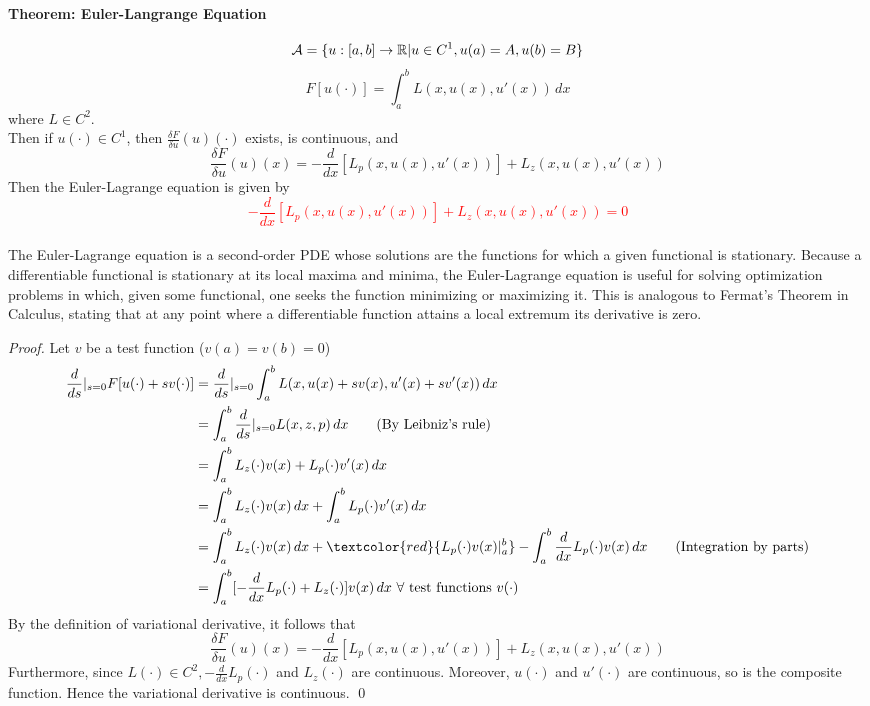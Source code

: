 \documentclass[11pt]{article}
\begin{document}
\paragraph{Theorem: Euler-Langrange Equation}
$$\mathcal{A} = \{ u: [a,b] \rightarrow \mathbb{R} | u \in C^1, u(a) = A, u(b) = B\}$$
$$F[u(\cdot)] = \int_a^b L(x,u(x),u'(x))\, dx$$
where $L \in C^2$. \\
Then if $u(\cdot) \in C^1$, then
$\frac{\delta F}{\delta u}(u)(\cdot)$ exists, is continuous, and
$$\frac{\delta F}{\delta u}(u)(x) = -\frac{d}{dx}[L_p(x,u(x),u'(x))] + L_z(x,u(x),u'(x))$$
Then the Euler-Lagrange equation is given by
\textcolor{red}{$$-\frac{d}{dx}[L_p(x,u(x),u'(x))] + L_z(x,u(x),u'(x)) = 0$$}\\
 The Euler-Lagrange equation is a second-order PDE whose solutions are the functions for which a given functional is stationary. Because a differentiable functional is stationary at its local maxima and minima, the Euler-Lagrange equation is useful for solving optimization problems in which, given some functional, one seeks the function minimizing or maximizing it. This is analogous to Fermat's Theorem in Calculus, stating that at any point where a differentiable function attains a local extremum its derivative is zero. \\
\begin{proof}
	Let $v$ be a test function ($v(a) = v(b) = 0$)
	\begin{align}
		\frac{d}{ds} |_{s=0} F[u(\cdot) + sv(\cdot)] 
		&= \frac{d}{ds}|_{s=0}\int_a^b L(x, u(x) + sv(x), u'(x) + sv'(x)) \, dx \\
		&= \int_a^b \frac{d}{ds}|_{s=0} L(x,z,p)\, dx \tag{By Leibniz's rule}\\
		&= \int_a^b L_z(\cdot)v(x) + L_p(\cdot)v'(x)\, dx \\
		&= \int_a^b L_z(\cdot)v(x) \, dx + \int_a^b L_p(\cdot)v'(x)\, dx \\
		&= \int_a^b L_z(\cdot)v(x) \, dx + \textcolor{red}{L_p(\cdot)v(x)|_a^b} - \int_a^b \frac{d}{dx}L_p(\cdot)v(x) \, dx \tag{Integration by parts} \\
		&= \int_a^b [-\frac{d}{dx}L_p(\cdot) + L_z(\cdot)]v(x) \, dx \text{  $\forall$ test functions $v(\cdot)$} 
	\end{align}
	By the definition of variational derivative, it follows that 
	$$\frac{\delta F}{\delta u}(u)(x) = -\frac{d}{dx}[L_p(x,u(x),u'(x))] + L_z(x,u(x),u'(x))$$
	Furthermore, since $L(\cdot) \in C^2, -\frac{d}{dx}L_p(\cdot)$ and $L_z(\cdot)$ are  continuous. Moreover, $u(\cdot)$ and $u'(\cdot)$ are continuous, so is the composite function. Hence the variational derivative is continuous. \qed
\end{proof}
\end{document}
